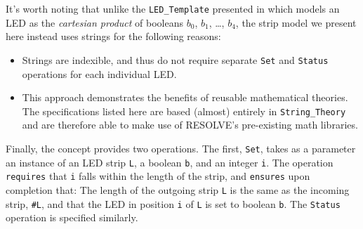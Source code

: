 
It's worth noting that unlike the \texttt{LED\_Template} presented in \cite{regula:2010} which models an LED as the \textit{cartesian product} of booleans $b_0$, $b_1$, \ldots , $b_4$, the strip model we present here instead uses strings for the following reasons:
\begin{itemize}
\item Strings are indexible, and thus do not require separate \texttt{Set} and \texttt{Status} operations for each individual LED.
\item This approach demonstrates the benefits of reusable mathematical theories. The specifications listed here are based (almost) entirely in \texttt{String\_Theory} and are therefore able to make use of RESOLVE's pre-existing math libraries.
\end{itemize}

Finally, the concept provides two operations. The first, \texttt{Set}, takes as a parameter an instance of an LED strip \texttt{L}, a boolean \texttt{b}, and an integer \texttt{i}. The operation \texttt{requires} that \texttt{i} falls within the length of the strip, and \texttt{ensures} upon completion that: The length of the outgoing strip \texttt{L} is the same as the incoming strip, \texttt{\#L}, and that the LED in position \texttt{i} of \texttt{L} is set to boolean \texttt{b}. The \texttt{Status} operation is specified similarly. 

